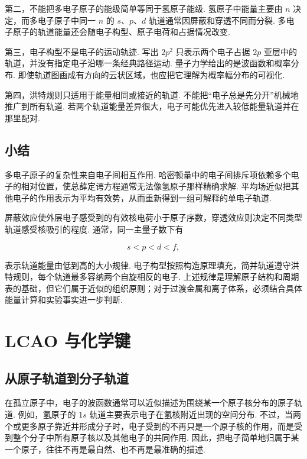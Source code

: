 \documentclass[UTF8,11pt,a4paper,openany]{ctexbook}
\begin{document}
\begin{limitbox}
第二，不能把多电子原子的能级简单等同于氢原子能级. 氢原子中能量主要由 $n$ 决定，而多电子原子中同一 $n$ 的 $s$、$p$、$d$ 轨道通常因屏蔽和穿透不同而分裂. 多电子原子的轨道能量还会随电子构型、原子电荷和占据情况改变. 
\end{limitbox}

\begin{limitbox}
第三，电子构型不是电子的运动轨迹. 写出 $2p^2$ 只表示两个电子占据 $2p$ 亚层中的轨道，并没有指定电子沿哪一条经典路径运动. 量子力学给出的是波函数和概率分布. 即使轨道图画成有方向的云状区域，也应把它理解为概率幅分布的可视化. 
\end{limitbox}

\begin{limitbox}
第四，洪特规则只适用于能量相同或接近的轨道. 不能把“电子总是先分开”机械地推广到所有轨道. 若两个轨道能量差异很大，电子可能优先进入较低能量轨道并在那里配对. 
\end{limitbox}

\section{小结}

多电子原子的复杂性来自电子间相互作用. 哈密顿量中的电子间排斥项依赖多个电子的相对位置，使总薛定谔方程通常无法像氢原子那样精确求解. 平均场近似把其他电子的作用表示为平均有效势，从而重新得到一组可解释的单电子轨道. 

屏蔽效应使外层电子感受到的有效核电荷小于原子序数，穿透效应则决定不同类型轨道感受核吸引的程度. 通常，同一主量子数下有

\[
s<p<d<f,
\]

表示轨道能量由低到高的大小规律. 电子构型按照构造原理填充，简并轨道遵守洪特规则，每个轨道最多容纳两个自旋相反的电子. 上述规律是理解原子结构和周期表的基础，但它们属于近似的组织原则；对于过渡金属和离子体系，必须结合具体能量计算和实验事实进一步判断. 
\chapter{LCAO 与化学键}

\section{从原子轨道到分子轨道}

在孤立原子中，电子的波函数通常可以近似描述为围绕某一个原子核分布的原子轨道. 例如，氢原子的 $1s$ 轨道主要表示电子在氢核附近出现的空间分布. 不过，当两个或更多原子靠近并形成分子时，电子受到的不再只是一个原子核的作用，而是受到整个分子中所有原子核以及其他电子的共同作用. 因此，把电子简单地归属于某一个原子，往往不再是最自然、也不再是最准确的描述. 
\end{document}
